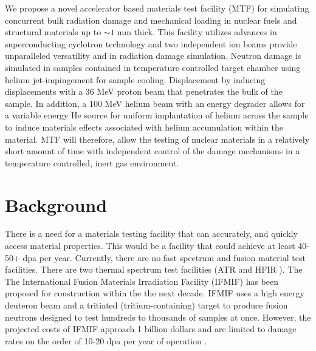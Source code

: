 \documentclass[final,3p,times,twocolumn]{elsarticle} %
\begin{document}

We propose a novel accelerator based materials test facility (MTF) for simulating concurrent bulk radiation damage and mechanical loading in nuclear fuels and structural materials up to $\sim 1\;\mathrm{mm}$ thick.  This facility utilizes advances in superconducting cyclotron technology and two independent ion beams provide unparalleled versatility and in radiation damage simulation.  Neutron damage is simulated in samples contained in temperature controlled target chamber using helium jet-impingement for sample cooling.  Displacement by inducing displacements with a 36 MeV proton beam that penetrates the bulk of the sample.  In addition, a 100 MeV helium beam with an energy degrader allows for a variable energy He source for uniform implantation of helium across the sample to induce materials effects associated with helium accumulation within the material.  MTF will therefore, allow the testing of nuclear materials in a relatively short amount of time with independent control of the damage mechanisms in a temperature controlled, inert gas environment.

\section{Background}

There is a need for a materials testing facility that can accurately, and quickly access material properties. This would be a facility that could achieve at least 40-50+ dpa per year. Currently, there are no fast spectrum and fusion material test facilities. There are two thermal spectrum test facilities (ATR \cite{?} and HFIR \cite{lucas1990review}). The The International Fusion Materials Irradiation Facility (IFMIF) has been proposed for construction within the the next decade. IFMIF uses a high energy deuteron beam and a tritiated (tritium-containing) target to produce fusion neutrons designed to test hundreds to thousands of samples at once. However, the projected costs of IFMIF approach 1 billion dollars and are limited to damage rates on the order of 10-20 dpa per year of operation \cite{?}.
\end{document}
